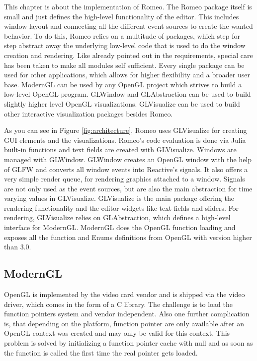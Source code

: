 This chapter is about the implementation of Romeo.
The Romeo package itself is small and just defines the high-level functionality of the editor.
This includes window layout and connecting all the different event sources to create the wanted behavior.
To do this, Romeo relies on a multitude of packages, which step for step abstract away the underlying low-level code that is used to do the window creation and rendering. 
Like already pointed out in the requirements, special care has been taken to make all modules self sufficient. 
Every single package can be used for other applications, which allows for higher flexibility and a broader user base.
ModernGL can be used by any OpenGL project which strives to build a low-level OpenGL program.
GLWindow and GLAbstraction can be used to build slightly higher level OpenGL visualizations. 
GLVisualize can be used to build other interactive visualization packages besides Romeo.

As you can see in Figure \ref{fig:architecture}, Romeo uses GLVisualize for creating \ac{GUI} elements and the visualizations. Romeo's code evaluation is done via Julia built-in functions and text fields are created with GLVisualize.
Windows are managed with GLWindow. 
GLWindow creates an OpenGL window with the help of GLFW and converts all window events into Reactive's signals. 
It also offers a very simple render queue, for rendering graphics attached to a window.
Signals are not only used as the event sources, but are also the main abstraction for time varying values in GLVisualize.
GLVisualize is the main package offering the rendering functionality and the editor widgets like text fields and sliders.
For rendering, GLVisualize relies on GLAbstraction, which defines a high-level interface for ModernGL.
ModernGL does the \ac{OpenGL} function loading and exposes all the function and Enums definitions from \ac{OpenGL} with version higher than 3.0.



\subsection{ModernGL}
\ac{OpenGL} is implemented by the video card vendor and is shipped via the video driver, which comes in the form of a C library.
The challenge is to load the function pointers system and vendor independent. 
Also one further complication is, that depending on the platform, 
function pointer are only available after an \ac{OpenGL} context was created and may only be valid for this context. \cite{wgl}
This problem is solved by initializing a function pointer cache with null and as soon as the function is called the first time the real pointer gets loaded.

